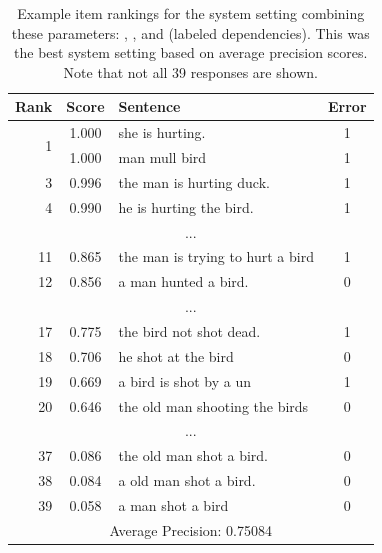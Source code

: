 \begin{table}[htb!]
\begin{center}
\setlength{\tabcolsep}{0.3em}
\begin{tabular}{|r|c|l|c|}
\hline
Rank & Score & Sentence & Error \\
\hline
\hline
\multirow{2}{*}{1} & 1.000 & she is hurting. & 1 \\
& 1.000 & man mull bird & 1 \\
\hline
3 & 0.996 & the man is hurting duck. & 1 \\
4 & 0.990 & he is hurting the bird. & 1 \\
\hline
\multicolumn{4}{|c|}{...} \\
\hline
11 & 0.865 & the man is trying to hurt a bird & 1 \\
12 & 0.856 & a man hunted a bird. & 0 \\
\hline
\multicolumn{4}{|c|}{...} \\
\hline
17 & 0.775 & the bird not shot dead.  & 1 \\
18 & 0.706 & he shot at the bird & 0 \\
19 & 0.669 & a bird is shot by a un & 1 \\
20 & 0.646 & the old man shooting the birds & 0 \\
\hline
\multicolumn{4}{|c|}{...} \\
\hline
37 & 0.086 & the old man shot a bird. & 0 \\
38 & 0.084 & a old man shot a bird. & 0 \\
39 & 0.058 & a man shot a bird & 0 \\
\hline
\hline
\multicolumn{4}{|c|}{Average Precision: 0.75084} \\
\hline
\end{tabular}
\caption{Example item rankings for the system setting combining these parameters: , , and  (labeled dependencies). This was the best system setting based on average precision scores. Note that not all 39 responses are shown.}
\label{tab:i10responses-avgprec}
\end{center}
\end{table}


